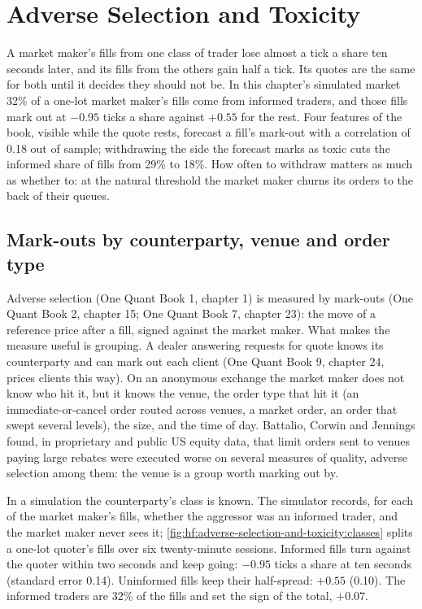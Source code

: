 \chapter{Adverse Selection and Toxicity}\label{ch:hf:adverse-selection-and-toxicity}

A market maker's fills from one class of trader lose almost a tick a share ten seconds later, and its fills from the others gain half a tick. Its
quotes are the same for both until it decides they should not be. In this chapter's simulated market 32\% of a one-lot market maker's fills come
from informed traders, and those fills mark out at $-0.95$ ticks a share against $+0.55$ for the rest. Four features of the book, visible while the
quote rests, forecast a fill's mark-out with a correlation of 0.18 out of sample; withdrawing the side the forecast marks as toxic cuts the informed
share of fills from 29\% to 18\%. How often to withdraw matters as much as whether to: at the natural threshold the market maker churns its orders
to the back of their queues.

\section{Mark-outs by counterparty, venue and order type}

Adverse selection (One Quant Book 1, chapter 1) is measured by mark-outs (One Quant Book 2, chapter 15; One Quant Book 7, chapter 23): the move of
a reference price after a fill, signed against the market maker. What makes the measure useful is grouping. A dealer answering requests for quote
knows its counterparty and can mark out each client (One Quant Book 9, chapter 24, prices clients this way). On an anonymous exchange the market
maker does not know who hit it, but it knows the venue, the order type that hit it (an immediate-or-cancel order routed across venues, a market
order, an order that swept several levels), the size, and the time of day. Battalio, Corwin and Jennings found, in proprietary and public US equity
data, that limit orders sent to venues paying large rebates were executed worse on several measures of quality, adverse selection among them: the
venue is a group worth marking out by.

In a simulation the counterparty's class is known. The simulator records, for each of the market maker's fills, whether the aggressor was an
informed trader, and the market maker never sees it; \cref{fig:hf:adverse-selection-and-toxicity:classes} splits a one-lot quoter's fills over six
twenty-minute sessions. Informed fills turn against the quoter within two seconds and keep going: $-0.95$ ticks a share at ten seconds (standard error
0.14). Uninformed fills keep their half-spread: $+0.55$ (0.10). The informed traders are 32\% of the fills and set the sign of the total, $+0.07$.

